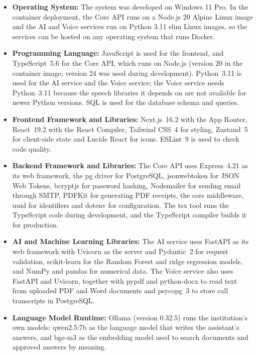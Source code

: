 \begin{itemize}
    \item \textbf{Operating System:}
    The system was developed on Windows 11 Pro. In the container deployment, the Core API runs on a Node.js 20 Alpine Linux image and the AI and Voice services run on Python 3.11 slim Linux images, so the services can be hosted on any operating system that runs Docker.

    \item \textbf{Programming Language:}
    JavaScript is used for the frontend, and TypeScript~5.6 for the Core API, which runs on Node.js (version 20 in the container image; version 24 was used during development). Python~3.11 is used for the AI service and the Voice service; the Voice service needs Python~3.11 because the speech libraries it depends on are not available for newer Python versions. SQL is used for the database schema and queries.

    \item \textbf{Frontend Framework and Libraries:}
    Next.js~16.2 with the App Router, React~19.2 with the React Compiler, Tailwind CSS~4 for styling, Zustand~5 for client-side state and Lucide React for icons. ESLint~9 is used to check code quality.

    \item \textbf{Backend Framework and Libraries:}
    The Core API uses Express~4.21 as its web framework, the pg driver for PostgreSQL, jsonwebtoken for JSON Web Tokens, bcryptjs for password hashing, Nodemailer for sending email through SMTP, PDFKit for generating PDF receipts, the cors middleware, uuid for identifiers and dotenv for configuration. The tsx tool runs the TypeScript code during development, and the TypeScript compiler builds it for production.

    \item \textbf{AI and Machine Learning Libraries:}
    The AI service uses FastAPI as its web framework with Uvicorn as the server and Pydantic~2 for request validation, scikit-learn for the Random Forest and ridge regression models, and NumPy and pandas for numerical data. The Voice service also uses FastAPI and Uvicorn, together with pypdf and python-docx to read text from uploaded PDF and Word documents and psycopg~3 to store call transcripts in PostgreSQL.

    \item \textbf{Language Model Runtime:}
    Ollama (version 0.32.5) runs the institution's own models: qwen2.5:7b as the language model that writes the assistant's answers, and bge-m3 as the embedding model used to search documents and approved answers by meaning.


\end{itemize}
